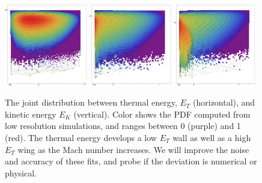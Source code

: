 
\begin{figure} \begin{center}
\includegraphics[width=0.32\textwidth]{figs/mach5_contours_comparison_V_MCMC.png}
\includegraphics[width=0.32\textwidth]{figs/mach10_contours_comparison_V_MCMC.png}
\includegraphics[width=0.32\textwidth]{figs/mach20_contours_comparison_V_MCMC.png}
\caption[ ]{The joint distribution between thermal energy, $E_T$ (horizontal), and kinetic
energy $E_K$ (vertical). Color shows the PDF computed from low resolution simulations, and ranges between 0 (purple) and 1
(red).  The thermal energy develops a low $E_T$ wall as well as a high $E_T$
wing as the Mach number increases.  We will improve the noise and accuracy of
these fits, and probe if the deviation is numerical or physical.}
\label{fig.energy} \end{center} \end{figure}
